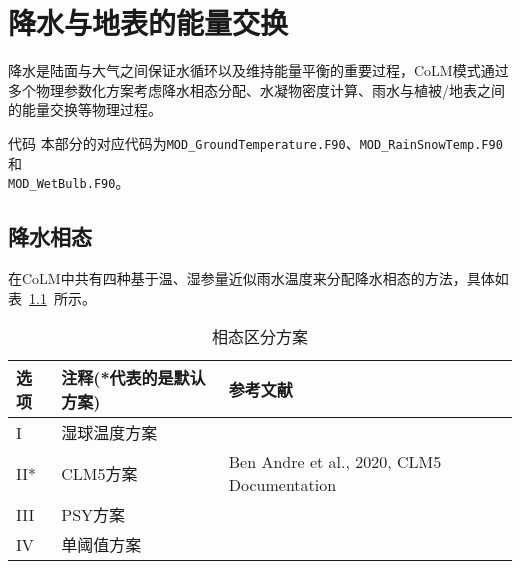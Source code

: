 \chapter{降水与地表的能量交换}
降水是陆面与大气之间保证水循环以及维持能量平衡的重要过程，CoLM模式通过多个物理参数化方案考虑降水相态分配、水凝物密度计算、雨水与植被/地表之间的能量交换等物理过程。

\begin{mymdframed}{代码}
本部分的对应代码为\texttt{MOD\_GroundTemperature.F90}、\texttt{MOD\_RainSnowTemp.F90}和\\
\texttt{MOD\_WetBulb.F90}。
\end{mymdframed}

\section{降水相态}\label{相态分配}
在CoLM中共有四种基于温、湿参量近似雨水温度来分配降水相态的方法，具体如表~\ref{tab:相态区分方案}~所示。

\begin{table}[]
\caption{相态区分方案}
\label{tab:相态区分方案}
\begin{tabular}[h]{p{1cm}p{5cm}p{10cm}}
\toprule
选项 & 注释(*代表的是默认方案) & 参考文献 \\\midrule
I & 湿球温度方案      & \citet{Wang-etal_19WetBulb}   \\
II*  & CLM5方案      & Ben Andre et al., 2020, CLM5 Documentation      \\
III  & PSY方案     & \citet{harder2013estimating}     \\
IV  & 单阈值方案     & \citet{us1956snow}     \\    \bottomrule

\end{tabular}
\end{table}

